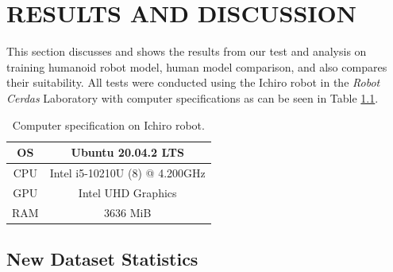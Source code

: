 \chapter{RESULTS AND DISCUSSION}
\label{chap:resultsandiscussion}


This section discusses and shows the results from our test and analysis on training humanoid robot model, human model comparison, and also compares their suitability.
All tests were conducted using the Ichiro robot in the \emph{Robot Cerdas} Laboratory with computer specifications as can be seen in Table \ref{tb:computerspecichiro}.

\def\arraystretch{1.5}
\begin{longtable}{|c|c|}
  \caption{Computer specification on Ichiro robot.}
  \label{tb:computerspecichiro}\\
  \hline
  OS      & Ubuntu 20.04.2 LTS \\
  \hline
  CPU     & Intel i5-10210U (8) @ 4.200GHz \\
  \hline
  GPU     & Intel UHD Graphics  \\
  \hline
  RAM     & 3636 MiB \\
  \hline
\end{longtable}


\section{New Dataset Statistics}
\label{sec:new-dataset-statistics}

